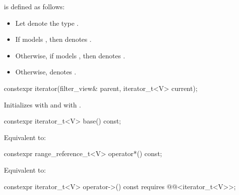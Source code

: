 \pnum
{} is defined as follows:
\begin{itemize}
\item Let  denote the type
.

\item If  models
,
then  denotes .

\item Otherwise, if   models
,
then  denotes .

\item Otherwise,  denotes .
\end{itemize}

%
\begin{itemdecl}
constexpr iterator(filter_view& parent, iterator_t<V> current);
\end{itemdecl}

\begin{itemdescr}
\pnum
\effects
Initializes  with  and
 with .
\end{itemdescr}

%
\begin{itemdecl}
constexpr iterator_t<V> base() const;
\end{itemdecl}

\begin{itemdescr}
\pnum
\effects
Equivalent to: 
\end{itemdescr}

%
\begin{itemdecl}
constexpr range_reference_t<V> operator*() const;
\end{itemdecl}

\begin{itemdescr}
\pnum
\effects
Equivalent to: 
\end{itemdescr}

%
\begin{itemdecl}
constexpr iterator_t<V> operator->() const
  requires @@<iterator_t<V>>;
\end{itemdecl}

